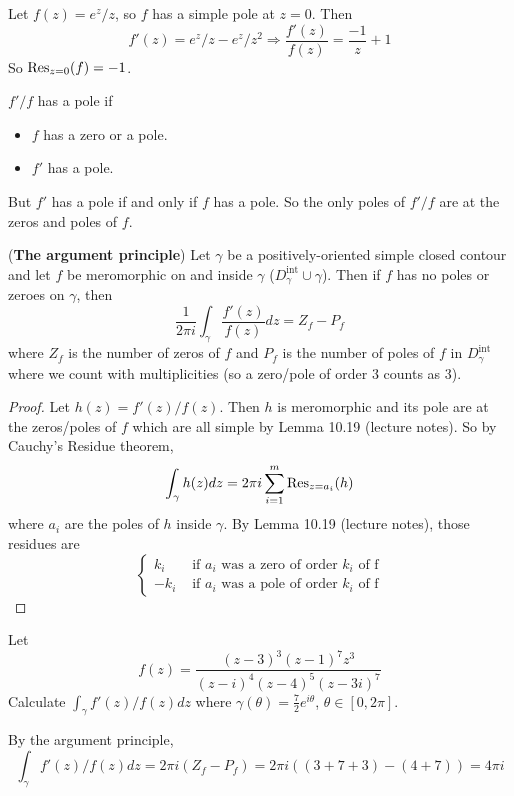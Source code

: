 \begin{example}
	Let $f(z) = e^z / z$, so $f$ has a simple pole at $z = 0$. Then
	\[
		f'(z) = e^z / z - e^z / z^2 \Longrightarrow \frac{f'(z)}{f(z)} = \frac{-1}{z} + 1
	\]
	So $\text{Res}_{z = 0}(f) = -1$.
\end{example}

\begin{remark}
	$f' / f$ has a pole if
	\begin{itemize}
		\item $f$ has a zero or a pole.
		\item $f'$ has a pole.
	\end{itemize}
	But $f'$ has a pole if and only if $f$ has a pole. So the only poles of $f' / f$ are at the zeros and poles of $f$.
\end{remark}

\begin{theorem}
	(\textbf{The argument principle}) Let $\gamma$ be a positively-oriented simple closed contour and let $f$ be meromorphic on and inside $\gamma$ ($D_{\gamma}^{\text{int}} \cup \gamma$). Then if $f$ has no poles or zeroes on $\gamma$, then
	\[
		\frac{1}{2 \pi i} \int_{\gamma} \frac{f'(z)}{f(z)} dz = Z_f - P_f
	\]
	where $Z_f$ is the number of zeros of $f$ and $P_f$ is the number of poles of $f$ in $D_{\gamma}^{\text{int}}$ where we count with multiplicities (so a zero/pole of order $3$ counts as $3$).
\end{theorem}

\begin{proof}
	Let $h(z) = f'(z) / f(z)$. Then $h$ is meromorphic and its pole are at the zeros/poles of $f$ which are all simple by Lemma 10.19 (lecture notes). So by Cauchy's Residue theorem,
	\[
		\int_{\gamma} h(z) dz = 2 \pi i \sum_{i = 1}^m \text{Res}_{z = a_i} (h)
	\]
	where $a_i$ are the poles of $h$ inside $\gamma$. By Lemma 10.19 (lecture notes), those residues are
	\[
		\begin{cases}
			k_i & \text{ if } a_i \text{ was a zero of order } k_i \text{ of f} \\
			-k_i & \text{ if } a_i \text{ was a pole of order } k_i \text{ of f}
		\end{cases}
	\]
\end{proof}

\begin{example}
	Let
	\[
		f(z) = \frac{{(z - 3)}^3 {(z - 1)}^7 z^3}{{(z - i)}^4 {(z - 4)}^5 {(z - 3i)}^7}
	\]
	Calculate $\int_{\gamma} f'(z) / f(z) dz$ where $\gamma(\theta) = \frac{7}{2} e^{i \theta}$, $\theta \in [0, 2\pi]$.

	By the argument principle,
	\[
		\int_{\gamma} f'(z) / f(z) dz = 2 \pi i (Z_f - P_f) = 2 \pi i ((3 + 7 + 3) - (4 + 7)) = 4 \pi i
	\]
\end{example}

